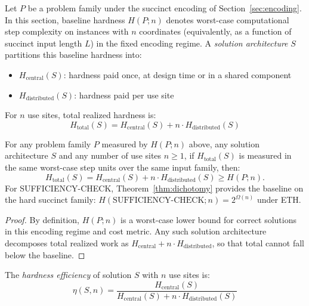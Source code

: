 \begin{definition}\label{def:hardness-distribution}
Let $P$ be a problem family under the succinct encoding of Section~\ref{sec:encoding}. In this section, baseline hardness $H(P;n)$ denotes worst-case computational step complexity on instances with $n$ coordinates (equivalently, as a function of succinct input length $L$) in the fixed encoding regime. A \emph{solution architecture} $S$ partitions this baseline hardness into:
\begin{itemize}
\item $H_{\text{central}}(S)$: hardness paid once, at design time or in a shared component
\item $H_{\text{distributed}}(S)$: hardness paid per use site
\end{itemize}
For $n$ use sites, total realized hardness is:
\[H_{\text{total}}(S) = H_{\text{central}}(S) + n \cdot H_{\text{distributed}}(S)\]
\end{definition}

\begin{proposition}\label{prop:hardness-conservation}
For any problem family $P$ measured by $H(P;n)$ above, any solution architecture $S$ and any number of use sites $n \ge 1$, if $H_{\text{total}}(S)$ is measured in the same worst-case step units over the same input family, then:
\[
H_{\text{total}}(S) = H_{\text{central}}(S) + n \cdot H_{\text{distributed}}(S) \geq H(P;n).
\]
For SUFFICIENCY-CHECK, Theorem~\ref{thm:dichotomy} provides the baseline on the hard succinct family: $H(\text{SUFFICIENCY-CHECK};n)=2^{\Omega(n)}$ under ETH.
\end{proposition}

\begin{proof}
By definition, $H(P;n)$ is a worst-case lower bound for correct solutions in this encoding regime and cost metric. Any such solution architecture decomposes total realized work as $H_{\text{central}} + n\cdot H_{\text{distributed}}$, so that total cannot fall below the baseline.
\end{proof}

\begin{definition}\label{def:hardness-efficiency}
The \emph{hardness efficiency} of solution $S$ with $n$ use sites is:
\[\eta(S, n) = \frac{H_{\text{central}}(S)}{H_{\text{central}}(S) + n \cdot H_{\text{distributed}}(S)}\]
\end{definition}

